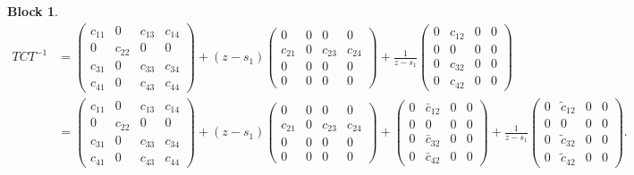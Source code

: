 \documentclass[12pt]{article}
\newtheorem{block}{Block}
\begin{document}
\begin{block}
\[
    \begin{aligned}
    T C T^{-1} &=
    \begin{pmatrix}
        c_{11} & 0 & c_{13} & c_{14} \\[10pt]
        0 & c_{22} & 0 & 0 \\[10pt]
        c_{31} & 0 & c_{33} & c_{34} \\[10pt]
        c_{41} & 0 & c_{43} & c_{44}
    \end{pmatrix}
    +(z-s_1) \begin{pmatrix}
        0 & 0 & 0 & 0 \\[10pt]
        c_{21} & 0 & c_{23} & c_{24} \\[10pt]
        0 & 0 & 0 & 0 \\[10pt]
        0 & 0 & 0 & 0
    \end{pmatrix}
    +\frac{1}{z-s_1} \begin{pmatrix}
        0 & c_{12}  & 0 & 0 \\[10pt]
        0 & 0 & 0 & 0 \\[10pt]
        0 & c_{32} & 0 & 0 \\[10pt]
        0 & c_{42} & 0 & 0
    \end{pmatrix}
    \\[10pt] &=
    \begin{pmatrix}
        c_{11} & 0 & c_{13} & c_{14} \\[10pt]
        0 & c_{22} & 0 & 0 \\[10pt]
        c_{31} & 0 & c_{33} & c_{34} \\[10pt]
        c_{41} & 0 & c_{43} & c_{44}
    \end{pmatrix}
    +(z-s_1) \begin{pmatrix}
        0 & 0 & 0 & 0 \\[10pt]
        c_{21} & 0 & c_{23} & c_{24} \\[10pt]
        0 & 0 & 0 & 0 \\[10pt]
        0 & 0 & 0 & 0
    \end{pmatrix}
    +\begin{pmatrix}
        0 & \bar{c}_{12}  & 0 & 0 \\[10pt]
        0 & 0 & 0 & 0 \\[10pt]
        0 & \bar{c}_{32} & 0 & 0 \\[10pt]
        0 & \bar{c}_{42} & 0 & 0
    \end{pmatrix}
    +\frac{1}{z-s_1} \begin{pmatrix}
        0 & \tilde{c}_{12}  & 0 & 0 \\[10pt]
        0 & 0 & 0 & 0 \\[10pt]
        0 & \tilde{c}_{32} & 0 & 0 \\[10pt]
        0 & \tilde{c}_{42} & 0 & 0
    \end{pmatrix}.
    \end{aligned}
\]


\end{block}
\end{document}
